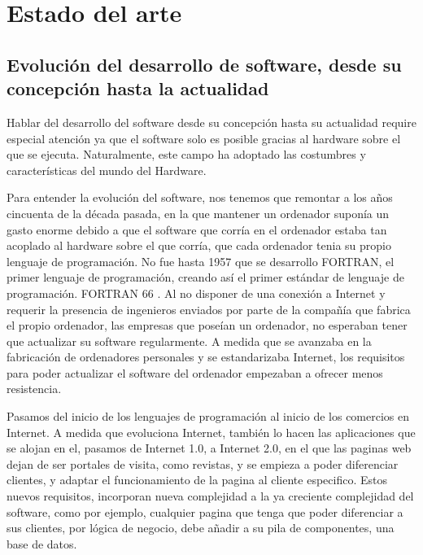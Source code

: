 \documentclass[12pt]{report} %
\begin{document}
	














\clearpage
{} %

\chapter{Estado del arte}

\section{Evolución del desarrollo de software, desde su concepción hasta la actualidad}

Hablar del desarrollo del software desde su concepción hasta su actualidad require especial atención ya que el software solo es posible gracias al hardware sobre el que se ejecuta.
Naturalmente, este campo ha adoptado las costumbres y características del mundo del Hardware.

Para entender la evolución del software, nos tenemos que remontar a los años cincuenta de la década pasada, en la que mantener un ordenador suponía un gasto enorme debido a que el software que corría en el ordenador estaba tan acoplado al hardware sobre el que corría, que cada ordenador tenia su propio lenguaje de programación. 
No fue hasta 1957 que se desarrollo FORTRAN, el primer lenguaje de programación, creando así el primer estándar de lenguaje de programación. FORTRAN 66 \cite{FORTRAN1966}.
Al no disponer de una conexión a Internet y requerir la presencia de ingenieros enviados por parte de la compañía que fabrica el propio ordenador, las empresas que poseían un ordenador, no esperaban tener que actualizar su software regularmente.
A medida que se avanzaba en la fabricación de ordenadores personales y se estandarizaba Internet, los requisitos para poder actualizar el software del ordenador empezaban a ofrecer menos resistencia.

Pasamos del inicio de los lenguajes de programación al inicio de los comercios en Internet.
A medida que evoluciona Internet, también lo hacen las aplicaciones que se alojan en el, pasamos de Internet 1.0, a  Internet 2.0, en el que las paginas web dejan de ser portales de visita, como revistas, y se empieza a poder diferenciar clientes, y adaptar el funcionamiento de la pagina al cliente especifico.
Estos nuevos requisitos, incorporan nueva complejidad a la ya creciente complejidad del software, como por ejemplo, cualquier pagina que tenga que poder diferenciar a sus clientes, por lógica de negocio, debe añadir a su pila de componentes, una base de datos.
\end{document}
